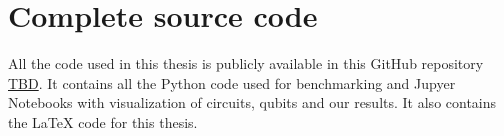 \chapter{Complete source code}\label{app:code}

All the code used in this thesis is publicly available in this GitHub repository \url{TBD}. It contains all the Python code used for benchmarking and Jupyer Notebooks with visualization of circuits, qubits and our results. It also contains the LaTeX code for this thesis.